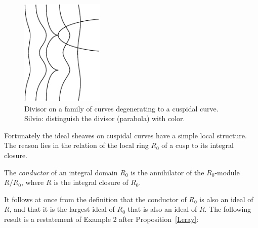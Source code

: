 \begin{figure}
\centerline {\includegraphics[height=2in]{"main/Fig13-1"}}
\caption{Divisor on a family of curves degenerating to a cuspidal curve. {Silvio: distinguish the divisor
(parabola) with color.}}
\label{Fig13.1}
\end{figure}

%

Fortunately the ideal sheaves on cuspidal curves have a simple local structure. The reason lies in the relation of the local ring $R_{0}$ of a cusp to its integral closure. 

\begin{definition}
The \emph{conductor} of an integral domain $R_{0}$ is the annihilator of the $R_{0}$-module
$R/R_{0}$, where $R$ is the integral closure of $R_{0}$.
\end{definition}

It follows at once from the definition that the conductor of $R_{0}$ is also an ideal of $R$, and that it is the largest ideal of $R_{0}$ that is also
an ideal of $R$. The following result is a restatement of Example 2 after Proposition~\ref{Leray}:

